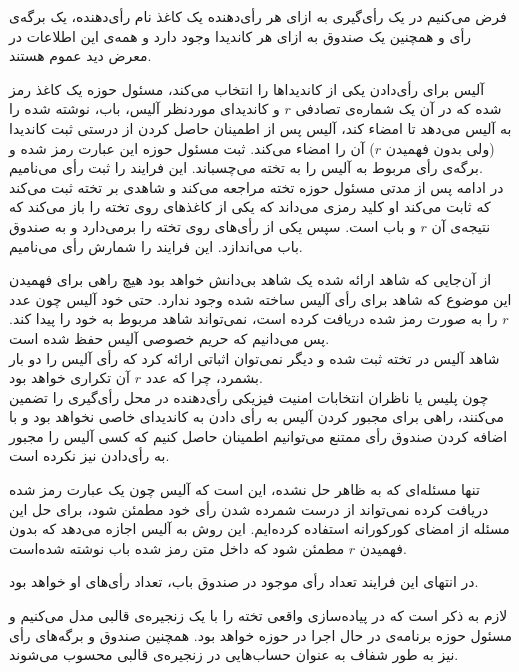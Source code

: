 \par
فرض می‌کنیم در یک رأی‌گیری به ازای هر رأی‌دهنده یک کاغذ نام رأی‌دهنده، یک برگه‌ی رأی و همچنین یک صندوق به ازای هر کاندیدا وجود دارد و همه‌ی این اطلاعات در معرض دید عموم هستند. 
\par
آلیس برای رأی‌دادن یکی از کاندیداها را انتخاب می‌کند، مسئول حوزه یک کاغذ رمز شده که در آن یک شماره‌ی تصادفی $r$ و کاندیدای موردنظر آلیس، باب، نوشته شده را به آلیس می‌دهد تا امضاء کند، آلیس پس از اطمینان حاصل کردن از درستی ثبت کاندیدا (ولی بدون فهمیدن $r$) آن را امضاء می‌کند. ثبت مسئول حوزه این عبارت رمز شده و برگه‌ی رأی مربوط به آلیس را به تخته می‌چسباند. این فرایند را ثبت رأی‌ می‌نامیم.
\\
در ادامه پس از مدتی مسئول حوزه تخته مراجعه‌ می‌کند و شاهدی
 بر تخته ثبت می‌کند که ثابت می‌کند او کلید رمزی می‌داند که یکی از کاغذ‌های روی تخته را باز می‌کند که نتیجه‌ی آن $r$ و باب است. سپس یکی از رأی‌های روی تخته را برمی‌دارد و به صندوق باب می‌اندازد. این فرایند را شمارش رأی‌ می‌نامیم.
\par
از آن‌جایی که شاهد ارائه شده یک شاهد بی‌دانش خواهد بود هیچ راهی برای فهمیدن این موضوع که شاهد برای رأی آلیس ساخته شده وجود ندارد. حتی خود آلیس چون عدد $r$ را به صورت رمز شده دریافت کرده است، نمی‌تواند شاهد مربوط به خود را پیدا کند. پس می‌دانیم که حریم خصوصی آلیس حفظ شده است. 
\\
 شاهد آلیس در تخته ثبت شده و دیگر نمی‌توان اثباتی ارائه کرد که رأی آلیس را دو بار بشمرد، چرا که عدد $r$ آن تکراری خواهد بود.
\\
چون پلیس یا ناظران انتخابات امنیت فیزیکی رأی‌دهنده در محل رأی‌گیری را تضمین می‌کنند، راهی برای مجبور کردن آلیس به رأی دادن به کاندیدای خاصی نخواهد بود و با اضافه کردن صندوق رأی ممتنع می‌توانیم اطمینان حاصل کنیم که کسی آلیس را مجبور به رأی‌دادن نیز نکرده است. 
\par 
تنها مسئله‌ای که به ظاهر حل نشده، این است که آلیس چون یک عبارت رمز شده دریافت کرده نمی‌تواند از درست شمرده شدن رأی خود مطمئن شود، برای حل این مسئله از امضای کورکورانه استفاده کرده‌ایم. این روش به آلیس اجازه می‌دهد که بدون فهمیدن $r$ مطمئن شود که داخل متن رمز شده باب نوشته شده‌است. 
\par 
در انتهای این فرایند تعداد رأی‌ موجود در صندوق باب، تعداد رأی‌های او خواهد بود.
\par 
لازم به ذکر است که در پیاده‌سازی واقعی تخته را با یک زنجیره‌ی قالبی مدل می‌کنیم و مسئول حوزه برنامه‌ی در حال اجرا در حوزه‌ خواهد بود. همچنین صندوق و برگه‌ها‌ی رأی نیز به طور شفاف به عنوان حساب‌هایی در زنجیره‌ی قالبی  محسوب می‌شوند. 


